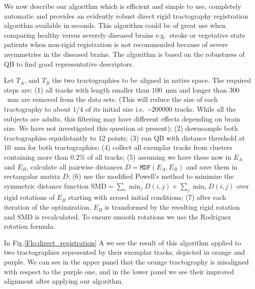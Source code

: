 \documentclass{bioinfo}
\begin{document}
We now describe our algorithm which is efficient and simple
to use, completely automatic and provides an evidently robust direct
rigid tractography registration algorithm available in seconds. This
algorithm could be of great use when comparing healthy versus severely
diseased brains e.g.~stroke or vegetative state patients when non-rigid
registration is not recommended because of severe asymmetries in the
diseased brains. The algorithm is based on the robustness of QB to find
good representative descriptors.

Let  $T_{A}$, and $T_{B}$ the two tractographies to be aligned
in native
space. The required steps are: (1) all tracks with length smaller than $100$~mm and longer than $300$~mm
are removed from the data sets. (This will reduce the size of each tractography
to about $1/4$ of its initial size i.e.~\textasciitilde \num{200000} tracks. While all
the subjects are adults, this filtering may have different effects
depending on brain size. We have not investigated this question at
present);
(2) downsample both tractographies equidistantly to $12$ points; 
(3) run QB with distance threshold at $10$~mm for both tractographies;
(4) collect all exemplar tracks from clusters containing more than $0.2\%$
of all tracks; (5) assuming we have these now in $E_{A}$ and $E_{B}$,
calculate all pairwise distances $D=\mathtt{MDF}(E_{A},E_{B})$ and
save them in rectangular matrix $D$;
(6) use the modified Powell's method \citep{fletcher1987practical} to minimize
the symmetric distance function $\mathrm{SMD}=\sum_{i}\min_{j}D(i,j)+\sum_{j}\min_{i}D(i,j)$ over rigid rotations of $E_{B}$ starting
with zeroed initial conditions; 
(7) after each iteration of the optimization,
$E_{B}$ is transformed by the resulting rigid rotation and $\mathrm{SMD}$
is recalculated. To ensure smooth rotations we use the Rodriguez
rotation formula.

In Fig.\ref{Flo:direct_registration} A we see the result of this
algorithm applied to two tractographies represented by their
exemplar tracks, depicted in orange and purple. We can see in the
upper panel that the orange tractography is misaligned with respect to
the purple one, and in the lower panel we see their improved alignment
after applying our algorithm.
\end{document}
